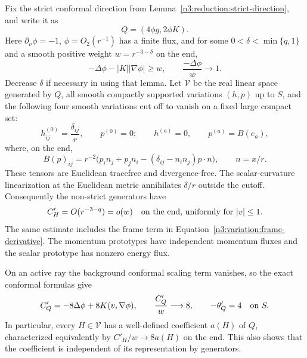Fix the strict conformal direction from
Lemma~\ref{n3:reduction:strict-direction}, and write it as
\[
 Q=(4\phi g,2\phi K).
\]
Here $\partial_\nu\phi=-1$, $\phi=O_2(r^{-1})$ has a finite flux,
and for some $0<\delta<\min\{q,1\}$ and a smooth positive weight
$w=r^{-3-\delta}$ on the end,
\begin{equation}
 -\Delta\phi-|K||\nabla\phi|\ge w,
 \qquad \frac{-\Delta\phi}{w}\longrightarrow1.
 \label{n3:variation:strict-weight}
\end{equation}
Decrease $\delta$ if necessary in using that lemma.
Let $\mathcal V$ be the real linear space generated by $Q$, all smooth
compactly supported variations $(h,p)$ up to $S$, and the following
four smooth variations cut off to vanish on a fixed large compact
set:
\begin{equation}
 h^{(0)}_{ij}=\frac{\delta_{ij}}r,\qquad p^{(0)}=0;
 \qquad h^{(a)}=0,\qquad p^{(a)}=B(e_a),
 \label{n3:variation:prototypes}
\end{equation}
where, on the end,
\begin{equation}
 B(p)_{ij}=r^{-2}
  \bigl(p_i n_j+p_j n_i-(\delta_{ij}-n_in_j)p\cdot n\bigr),
 \qquad n=x/r.
 \label{n3:variation:momentum-prototype}
\end{equation}
These tensors are Euclidean tracefree and divergence-free.
The scalar-curvature linearization at the Euclidean metric annihilates
$\delta/r$ outside the cutoff.  Consequently the non-strict generators
have
\begin{equation}
 C'_H=O(r^{-3-q})=o(w)
 \quad\hbox{on the end, uniformly for }|v|\le1.
 \label{n3:variation:prototype-error}
\end{equation}
The same estimate includes the frame term in
Equation~\eqref{n3:variation:frame-derivative}.  The momentum prototypes
have independent momentum fluxes and the scalar prototype has nonzero
energy flux.

On an active ray the background conformal scaling term vanishes, so
the exact conformal formulas give
\begin{equation}
 C'_Q=-8\Delta\phi+8K(v,\nabla\phi),\qquad
 \frac{C'_Q}{w}\longrightarrow8,
 \qquad -\theta'_Q=4\quad\hbox{on }S.
 \label{n3:variation:strict-active}
\end{equation}
In particular, every $H\in\mathcal V$ has a well-defined coefficient
$a(H)$ of $Q$, characterized equivalently by
$C'_H/w\to8a(H)$ on the end.  This also shows that the coefficient
is independent of its representation by generators.

